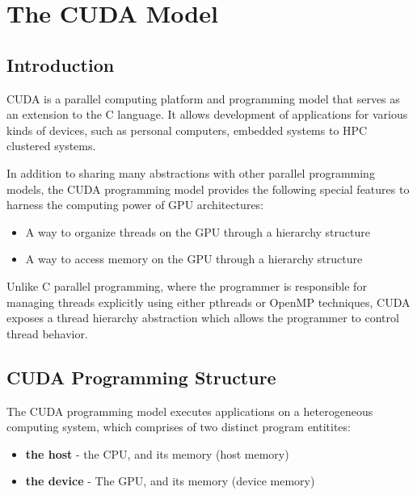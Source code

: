
\chapter{The CUDA Model} %

\label{Chapter2} %



\section{Introduction}


CUDA is a parallel computing platform and programming model that serves as an extension to the C language. It allows development of applications for various kinds of devices, such as personal computers, embedded systems to HPC clustered systems.

In addition to sharing many abstractions with other parallel programming models, the CUDA programming model provides the following special features to harness the computing power of GPU architectures: 
\begin{itemize}
    \item A way to organize threads on the GPU through a hierarchy structure
    \item A way to access memory on the GPU through a hierarchy structure
\end{itemize}

Unlike C parallel programming, where the programmer is responsible for managing threads explicitly using either pthreads or OpenMP techniques, CUDA exposes a thread hierarchy abstraction which allows the programmer to control thread behavior.

\section{CUDA Programming Structure}

The CUDA programming model executes applications on a heterogeneous computing system, which comprises of two distinct program entitites:
\begin{itemize}
	\item \textbf{the host} - the CPU, and its memory (host memory)
	\item \textbf{the device} - The GPU, and its memory (device memory)
\end{itemize}


